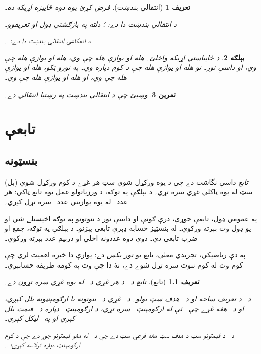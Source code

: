 \documentclass[12pt,a4paper,oneside]{report}
\newcommand{\Setabs}[2]{\{#1 : #2\}}
\newcommand{\Nat}{\mathbb{N}}
\newcommand{\Int}{\mathbb{Z}}
\newcommand{\Id}[1]{\mathord{\mathrm{Id}_{#1}}}
\newcommand{\ran}[1]{\mathrm{ran}(#1)}
\newcommand{\olfileid}[3]{\gdef\pspart{#1}\gdef\pschapter{#2}\gdef\pssection{#3}}
\newcommand{\olchapter}[3]{\gdef\pspart{#1}\gdef\pschapter{#2}\gdef\pssection{}\chapter{#3}\label{#1:#2::chap}}
\newcommand{\olsection}[1]{\section{#1}\label{\pspart:\pschapter:\pssection:sec}}
\newenvironment{explain}{}{}
\newtheorem{defn}{تعريف}[section]
\newtheorem{ex}[defn]{بېلګه}
\newtheorem{prob}[defn]{تمرين}
\begin{document}
\begin{defn}[انتقالي بندښت]فرض کړئ  يوه دوه ځاييزه اړيکه ده۔

د  \emph{انتقالي بندښت} دا دے:
\LR{$R^+ = \bigcup_{0 < n \in \Nat} R^n$}؛ دلته په بازګشتي ډول
 او  تعريفوو۔

د  \emph{انعکاسي انتقالي بندښت} دا دے:
\LR{$R^* = R^+ \cup \Id{A}$}۔
\end{defn}

\begin{ex}
د ځايناستي اړيکه \LR{$S \subseteq \Int^2$} واخلئ۔  هله او
يوازې هله چې  وي،  هله او يوازې هله چې
 وي، او داسې نور۔ نو  هله او يوازې هله چې
د کوم  دپاره  وي۔ په نورو ټکو، 
هله او يوازې هله چې  وي، او  هله او يوازې هله چې
 وي۔
\end{ex}

\begin{prob}
وښيئ چې د  انتقالي بندښت په رښتيا انتقالي دے۔
\end{prob}


\olchapter{sfr}{fun}{تابعې}


\olfileid{sfr}{fun}{bas}
\olsection{بنسټونه}

\begin{explain}
\emph{تابع} داسې نگاشت دے چې د يوه ورکړل شوي سټ هر غړے
د کوم ورکړل شوي (بل) سټ له يوه ټاکلي غړي سره تړي۔
د بېلګې په توګه، د  ورزياتولو عمل يوه تابع ټاکي: هر عدد~
له يوه يوازيني عدد~ سره تړل کېږي۔
  
په عمومي ډول، تابعې جوړې، درې ګونې او داسې نور د ننوتونو په توګه
اخيستلے شي او يو ډول وت بېرته ورکوي۔ له بنسټيز حسابه ډېرې تابعې
پېژنو۔ د بېلګې په توګه، جمع او ضرب تابعې دي۔ دوې دوه عددونه
اخلي او درېيم عدد بېرته ورکوي۔

په دې رياضيکي، تجريدي معنٰی، تابع يو \emph{تور بکس} دے:
يوازې دا خبره اهميت لري چې کوم وت له کوم ننوت سره تړل شوے دے،
نۀ دا چې وت په کومه طريقه حسابېږي۔
\end{explain}

\begin{defn}[تابع]
\emph{تابع}  د~ د هر غړي
د~ له يوه غړي سره تړون دے۔

 د~ \emph{د تعريف ساحه} او  د~ \emph{هدف سټ} بولو۔
د~ غړي د~ ننوتونه يا \emph{ارګومېنټونه} بلل کېږي،
او د~ هغه غړے چې~ ئې له ارګومېنټ~ سره تړي،
د ارګومېنټ~ دپاره \emph{د~ قيمت} بلل کېږي او په~ ليکل کېږي۔

د~ \emph{د قيمتونو سټ} \LR{$\ran{f}$} د هدف سټ هغه فرعي سټ دے چې
د~ له هغو قيمتونو جوړ دے چې د کوم ارګومېنټ دپاره ترلاسه کېږي؛
\LR{$\ran{f} = \Setabs{f(x)}{x \in A}$}۔
\end{defn}
\end{document}
